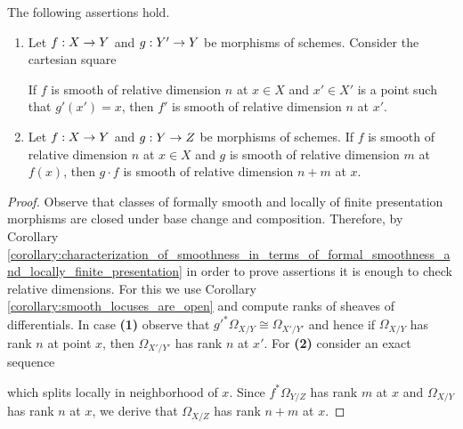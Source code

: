 \begin{proposition}\label{proposition:smooth_morphisms_are_closed_under_base_change_and_composition}
The following assertions hold.
\begin{enumerate}[label=\emph{\textbf{(\arabic*)}}, leftmargin=3.0em]
\item Let $f:X\rightarrow Y$ and $g:Y'\rightarrow Y$ be morphisms of schemes. Consider the cartesian square
\begin{center}
\end{center} 
If $f$ is smooth of relative dimension $n$ at $x\in X$ and $x'\in X'$ is a point such that $g'(x')=x$, then $f'$ is smooth of relative dimension $n$ at $x'$.
\item Let $f:X\rightarrow Y$ and $g:Y\rightarrow Z$ be morphisms of schemes. If $f$ is smooth of relative dimension $n$ at $x\in X$ and $g$ is smooth of relative dimension $m$ at $f(x)$, then $g\cdot f$ is smooth of relative dimension $n+m$ at $x$.
\end{enumerate}
\end{proposition}
\begin{proof}
Observe that classes of formally smooth and locally of finite presentation morphisms are closed under base change and composition. Therefore, by Corollary \ref{corollary:characterization_of_smoothness_in_terms_of_formal_smoothness_and_locally_finite_presentation} in order to prove assertions it is enough to check relative dimensions. For this we use Corollary \ref{corollary:smooth_locuses_are_open} and compute ranks of sheaves of differentials. In case \textbf{(1)} observe that $g'^*\Omega_{X/Y}\cong \Omega_{X'/Y'}$ and hence if $\Omega_{X/Y}$ has rank $n$ at point $x$, then $\Omega_{X'/Y'}$ has rank $n$ at $x'$. For \textbf{(2)} consider an exact sequence
\begin{center}
\end{center}
which splits locally in neighborhood of $x$. Since $f^*\Omega_{Y/Z}$ has rank $m$ at $x$ and $\Omega_{X/Y}$ has rank $n$ at $x$, we derive that $\Omega_{X/Z}$ has rank $n+m$ at $x$.
\end{proof}

